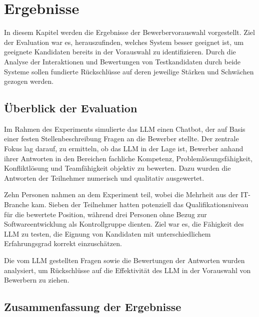 
\chapter{Ergebnisse}

In diesem Kapitel werden die Ergebnisse der Bewerbervorauswahl vorgestellt. Ziel der Evaluation war es, herauszufinden, welches System besser geeignet ist, um geeignete Kandidaten bereits in der Vorauswahl zu identifizieren. Durch die Analyse der Interaktionen und Bewertungen von Testkandidaten durch beide Systeme sollen fundierte Rückschlüsse auf deren jeweilige Stärken und Schwächen gezogen werden.

\section{Überblick der Evaluation}

Im Rahmen des Experiments simulierte das LLM einen Chatbot, der auf Basis einer festen Stellenbeschreibung Fragen an die Bewerber stellte. Der zentrale Fokus lag darauf, zu ermitteln, ob das LLM in der Lage ist, Bewerber anhand ihrer Antworten in den Bereichen fachliche Kompetenz, Problemlösungsfähigkeit, Konfliktlösung und Teamfähigkeit objektiv zu bewerten. Dazu wurden die Antworten der Teilnehmer numerisch und qualitativ ausgewertet.

Zehn Personen nahmen an dem Experiment teil, wobei die Mehrheit aus der IT-Branche kam. Sieben der Teilnehmer hatten potenziell das Qualifikationsniveau für die bewertete Position, während drei Personen ohne Bezug zur Softwareentwicklung als Kontrollgruppe dienten. Ziel war es, die Fähigkeit des LLM zu testen, die Eignung von Kandidaten mit unterschiedlichem Erfahrungsgrad korrekt einzuschätzen.

Die vom LLM gestellten Fragen sowie die Bewertungen der Antworten wurden analysiert, um Rückschlüsse auf die Effektivität des LLM in der Vorauswahl von Bewerbern zu ziehen.

\section{Zusammenfassung der Ergebnisse}
